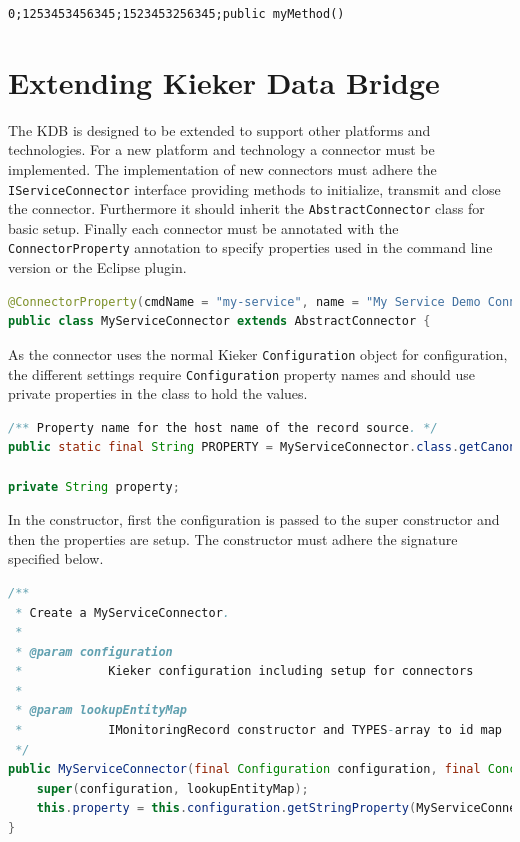 \documentclass[11pt,a4paper]{article}
\begin{document}
\begin{verbatim}
0;1253453456345;1523453256345;public myMethod()
\end{verbatim}


\section{Extending Kieker Data Bridge}\label{s:extension}

The KDB is designed to be extended to support other platforms and technologies. For a new platform and technology a connector must be implemented. The implementation of new connectors must adhere the \texttt{IServiceConnector} interface providing methods to initialize, transmit and close the connector. Furthermore it should inherit the \texttt{AbstractConnector} class for basic setup. Finally each connector must be annotated with the \texttt{ConnectorProperty} annotation to specify properties used in the command line version or the Eclipse plugin.

\begin{lstlisting}[language=Java,caption=Example connector declaration]
@ConnectorProperty(cmdName = "my-service", name = "My Service Demo Connector", description = "example connector for documentation.")
public class MyServiceConnector extends AbstractConnector {
\end{lstlisting}

\noindent As the connector uses the normal Kieker \texttt{Configuration} object for configuration, the different settings require \texttt{Configuration} property names and should use private properties in the class to hold the values.

\begin{lstlisting}[language=Java,caption=Example constant for connector configuration and its accompanying property declaration]
/** Property name for the host name of the record source. */
public static final String PROPERTY = MyServiceConnector.class.getCanonicalName() + ".property";

private String property;
\end{lstlisting}

\noindent In the constructor, first the configuration is passed to the super constructor and then the properties are setup. The constructor must adhere the signature specified below.

\begin{lstlisting}[language=Java,caption=Example connector declaration]
/**
 * Create a MyServiceConnector.
 * 
 * @param configuration
 *            Kieker configuration including setup for connectors
 * 
 * @param lookupEntityMap
 *            IMonitoringRecord constructor and TYPES-array to id map
 */
public MyServiceConnector(final Configuration configuration, final ConcurrentMap<Integer, LookupEntity> lookupEntityMap) {
	super(configuration, lookupEntityMap);
	this.property = this.configuration.getStringProperty(MyServiceConnector.PROPERTY);
}
\end{lstlisting}
\end{document}
